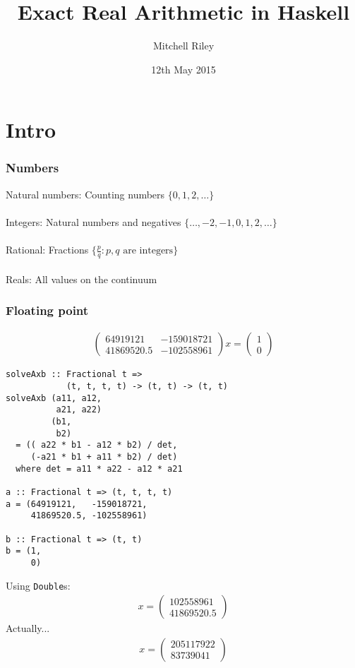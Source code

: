 \documentclass[11pt]{beamer}
\author{Mitchell Riley}
\title{Exact Real Arithmetic in Haskell}
\date{12th May 2015}
\begin{document}
\begin{frame}
\titlepage
\end{frame}

\section{Intro}

\begin{frame}
\frametitle{Numbers}
Natural numbers: Counting numbers $\{0, 1, 2, \dots\}$
\\~\\
Integers: Natural numbers and negatives $\{\dots, -2, -1, 0, 1, 2, \dots\}$
\\~\\
Rational: Fractions $\{\frac{p}{q} : p, q \text{ are integers}\}$
\\~\\
Reals: All values on the continuum
\end{frame}

\begin{frame}
\frametitle{Floating point}
\begin{align*}
\begin{pmatrix}
64919121   & -159018721 \\
41869520.5 & -102558961
\end{pmatrix} x =
\begin{pmatrix}
1 \\
0
\end{pmatrix}
\end{align*}
\end{frame}

\begin{frame}[fragile]
\begin{verbatim}
solveAxb :: Fractional t =>
            (t, t, t, t) -> (t, t) -> (t, t)
solveAxb (a11, a12,
          a21, a22)
         (b1,
          b2)
  = (( a22 * b1 - a12 * b2) / det,
     (-a21 * b1 + a11 * b2) / det)
  where det = a11 * a22 - a12 * a21

a :: Fractional t => (t, t, t, t)
a = (64919121,   -159018721,
     41869520.5, -102558961)

b :: Fractional t => (t, t)
b = (1,
     0)
\end{verbatim}
\end{frame}

\begin{frame}
Using \texttt{Double}s:
\begin{align*}
x =
\begin{pmatrix}
102558961 \\
41869520.5
\end{pmatrix}
\end{align*}
\pause
Actually...
\begin{align*}
x =
\begin{pmatrix}
205117922 \\
83739041
\end{pmatrix}
\end{align*}
\end{frame}
\end{document}
